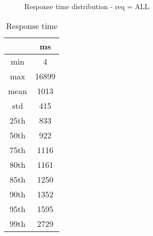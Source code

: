\begin{minipage}{0.75\linewidth}
\begin{figure}[h]
\begin{adjustbox}{max width=1.0\linewidth, keepaspectratio}
  \end{adjustbox}
  \caption{Response time distribution - req = ALL}
\end{figure}
\end{minipage}\hfill\begin{minipage}{0.18\linewidth}
\begin{table}[h]
\begin{tabular}{|cc|}
\hline
\textbf{} & \textbf{ms}\\ \hline
 \Xhline{0.005\arrayrulewidth}
min & 4\\
 \Xhline{0.005\arrayrulewidth}
max & 16899\\
 \Xhline{0.005\arrayrulewidth}
mean & 1013\\
 \Xhline{0.005\arrayrulewidth}
std & 415\\
\hline
\hline
 \Xhline{0.005\arrayrulewidth}
25th & 833\\
 \Xhline{0.005\arrayrulewidth}
50th & 922\\
 \Xhline{0.005\arrayrulewidth}
75th & 1116\\
 \Xhline{0.005\arrayrulewidth}
80th & 1161\\
 \Xhline{0.005\arrayrulewidth}
85th & 1250\\
 \Xhline{0.005\arrayrulewidth}
90th & 1352\\
 \Xhline{0.005\arrayrulewidth}
95th & 1595\\
 \Xhline{0.005\arrayrulewidth}
99th & 2729\\
\hline
\end{tabular}
\caption{Response time}
\end{table}
\end{minipage}\hfill